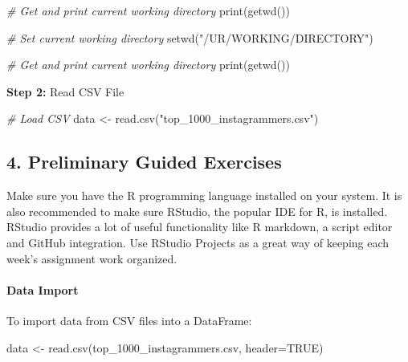 \documentclass[
]{article}
\newenvironment{Shaded}{\begin{snugshade}}{\end{snugshade}}
\newcommand{\AttributeTok}[1]{\textcolor[rgb]{0.77,0.63,0.00}{#1}}
\newcommand{\CommentTok}[1]{\textcolor[rgb]{0.56,0.35,0.01}{\textit{#1}}}
\newcommand{\ConstantTok}[1]{\textcolor[rgb]{0.00,0.00,0.00}{#1}}
\newcommand{\FunctionTok}[1]{\textcolor[rgb]{0.00,0.00,0.00}{#1}}
\newcommand{\NormalTok}[1]{#1}
\newcommand{\OtherTok}[1]{\textcolor[rgb]{0.56,0.35,0.01}{#1}}
\newcommand{\StringTok}[1]{\textcolor[rgb]{0.31,0.60,0.02}{#1}}
\begin{document}
\begin{Shaded}
\begin{Highlighting}[]
\CommentTok{\# Get and print current working directory}
\FunctionTok{print}\NormalTok{(}\FunctionTok{getwd}\NormalTok{())}

\CommentTok{\# Set current working directory}
\FunctionTok{setwd}\NormalTok{(}\StringTok{"/UR/WORKING/DIRECTORY"}\NormalTok{)}

\CommentTok{\# Get and print current working directory}
\FunctionTok{print}\NormalTok{(}\FunctionTok{getwd}\NormalTok{())}
\end{Highlighting}
\end{Shaded}

\textbf{Step 2:} Read CSV File

\begin{Shaded}
\begin{Highlighting}[]
\CommentTok{\# Load CSV}
\NormalTok{data }\OtherTok{\textless{}{-}} \FunctionTok{read.csv}\NormalTok{(}\StringTok{"top\_1000\_instagrammers.csv"}\NormalTok{)}
\end{Highlighting}
\end{Shaded}

\hypertarget{preliminary-guided-exercises}{%
\subsection{4. Preliminary Guided
Exercises}\label{preliminary-guided-exercises}}

Make sure you have the R programming language installed on your system.
It is also recommended to make sure RStudio, the popular IDE for R, is
installed. RStudio provides a lot of useful functionality like R
markdown, a script editor and GitHub integration. Use RStudio Projects
as a great way of keeping each week's assignment work organized.

\pagebreak

\hypertarget{data-import}{%
\paragraph{Data Import}\label{data-import}}

To import data from CSV files into a DataFrame:

\begin{Shaded}
\begin{Highlighting}[]
\NormalTok{data }\OtherTok{\textless{}{-}} \FunctionTok{read.csv}\NormalTok{(}\StringTok{\textquotesingle{}top\_1000\_instagrammers.csv\textquotesingle{}}\NormalTok{, }\AttributeTok{header=}\ConstantTok{TRUE}\NormalTok{)}
\end{Highlighting}
\end{Shaded}
\end{document}
